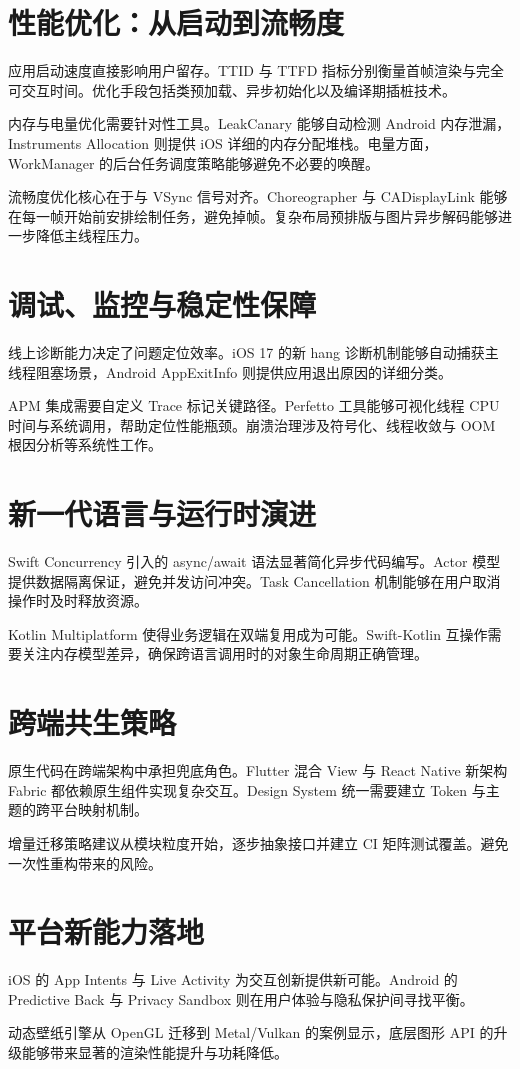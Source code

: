 \chapter{性能优化：从启动到流畅度}
应用启动速度直接影响用户留存。TTID 与 TTFD 指标分别衡量首帧渲染与完全可交互时间。优化手段包括类预加载、异步初始化以及编译期插桩技术。\par
内存与电量优化需要针对性工具。LeakCanary 能够自动检测 Android 内存泄漏，Instruments Allocation 则提供 iOS 详细的内存分配堆栈。电量方面，WorkManager 的后台任务调度策略能够避免不必要的唤醒。\par
流畅度优化核心在于与 VSync 信号对齐。Choreographer 与 CADisplayLink 能够在每一帧开始前安排绘制任务，避免掉帧。复杂布局预排版与图片异步解码能够进一步降低主线程压力。\par
\chapter{调试、监控与稳定性保障}
线上诊断能力决定了问题定位效率。iOS 17 的新 hang 诊断机制能够自动捕获主线程阻塞场景，Android AppExitInfo 则提供应用退出原因的详细分类。\par
APM 集成需要自定义 Trace 标记关键路径。Perfetto 工具能够可视化线程 CPU 时间与系统调用，帮助定位性能瓶颈。崩溃治理涉及符号化、线程收敛与 OOM 根因分析等系统性工作。\par
\chapter{新一代语言与运行时演进}
Swift Concurrency 引入的 async/await 语法显著简化异步代码编写。Actor 模型提供数据隔离保证，避免并发访问冲突。Task Cancellation 机制能够在用户取消操作时及时释放资源。\par
Kotlin Multiplatform 使得业务逻辑在双端复用成为可能。Swift-Kotlin 互操作需要关注内存模型差异，确保跨语言调用时的对象生命周期正确管理。\par
\chapter{跨端共生策略}
原生代码在跨端架构中承担兜底角色。Flutter 混合 View 与 React Native 新架构 Fabric 都依赖原生组件实现复杂交互。Design System 统一需要建立 Token 与主题的跨平台映射机制。\par
增量迁移策略建议从模块粒度开始，逐步抽象接口并建立 CI 矩阵测试覆盖。避免一次性重构带来的风险。\par
\chapter{平台新能力落地}
iOS 的 App Intents 与 Live Activity 为交互创新提供新可能。Android 的 Predictive Back 与 Privacy Sandbox 则在用户体验与隐私保护间寻找平衡。\par
动态壁纸引擎从 OpenGL 迁移到 Metal/Vulkan 的案例显示，底层图形 API 的升级能够带来显著的渲染性能提升与功耗降低。\par
